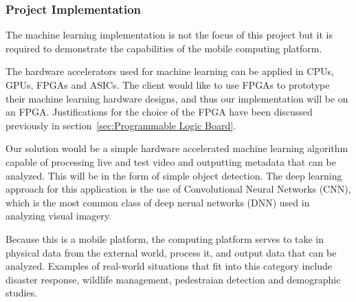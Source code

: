 % 

\subsubsection{Project Implementation}
The machine learning implementation is not the focus of this project but it is required to demonstrate the capabilities of the mobile computing platform. 

The hardware accelerators used for machine learning can be applied in CPUs, GPUs, FPGAs and ASICs. The client would like to use FPGAs to prototype their machine learning hardware designs, and thus our implementation will be on an FPGA. Justifications for the choice of the FPGA have been discussed previously in section~\ref{sec:Programmable Logic Board}.

Our solution would be a simple hardware accelerated machine learning algorithm capable of processing live and test video and outputting metadata that can be analyzed. This will be in the form of simple object detection. The deep learning approach for this application is the use of Convolutional Neural Networks (CNN), which is the most common class of deep nerual networks (DNN) used in analyzing visual imagery.

Because this is a mobile platform, the computing platform serves to take in physical data from the external world, process it, and output data that can be analyzed. Examples of real-world situations that fit into this category include disaster response, wildlife management, pedestraian detection and demographic studies.



